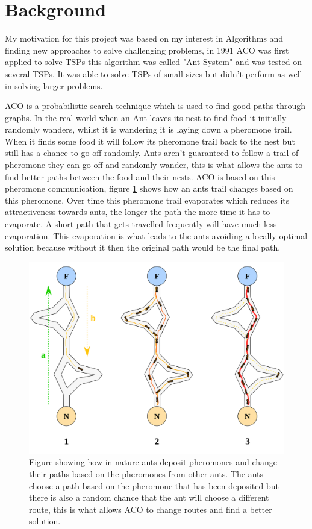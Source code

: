 \section{Background}
My motivation for this project was based on my interest in Algorithms and finding new approaches to solve challenging problems, in 1991 ACO was first applied to solve TSPs\cite{dorigo1991distributed} this algorithm was called "Ant System" and was tested on several TSPs. It was able to solve TSPs of small sizes but didn't perform as well in solving larger problems. 

ACO is a probabilistic search technique which is used to find good paths through graphs. In the real world when an Ant leaves its nest to find food it initially randomly wanders, whilst it is wandering it is laying down a pheromone trail. When it finds some food it will follow its pheromone trail back to the nest but still has a chance to go off randomly. Ants aren't guaranteed to follow a trail of pheromone they can go off and randomly wander, this is what allows the ants to find better paths between the food and their nests. ACO is based on this pheromone communication, figure \ref{fig:aco_pheremone_example} shows how an ants trail changes based on this pheromone. Over time this pheromone trail evaporates which reduces its attractiveness towards ants, the longer the path the more time it has to evaporate. A short path that gets travelled frequently will have much less evaporation. This evaporation is what leads to the ants avoiding a locally optimal solution because without it then the original path would be the final path.

\begin{figure}
    \centering
    \includegraphics[width=\textwidth]{figures/aco_pheremone_demo.png}
    \caption{Figure showing how in nature ants deposit pheromones and change their paths based on the pheromones from other ants. The ants choose a path based on the pheromone that has been deposited but there is also a random chance that the ant will choose a different route, this is what allows ACO to change routes and find a better solution.}
    \label{fig:aco_pheremone_example}
\end{figure}

